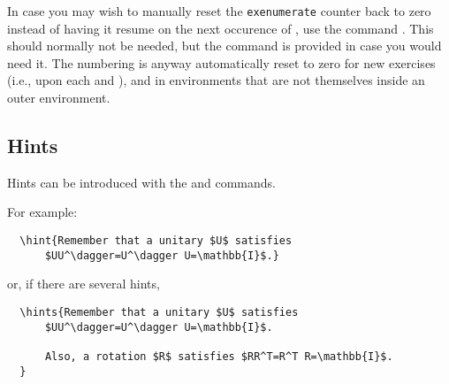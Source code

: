 \documentclass[11pt,a4paper]{article}
\begin{document}

In case you may wish to manually reset the \texttt{exenumerate} counter back to zero
instead of having it resume on the next occurence of , use the
command . This 
should normally not be needed, but the command is provided in case you would need it. The
numbering is anyway automatically reset to zero for new exercises (i.e., upon each
 and ), and in  environments that are not
themselves inside an outer  environment. 



\subsection{Hints}
\label{sec:Hints}

Hints can be introduced with the  and  commands.



For example:
\begin{pkgverbatim}
\begin{verbatim}
  \hint{Remember that a unitary $U$ satisfies
      $UU^\dagger=U^\dagger U=\mathbb{I}$.}
\end{verbatim}
\end{pkgverbatim}
or, if there are several hints,
\begin{pkgverbatim}
\begin{verbatim}
  \hints{Remember that a unitary $U$ satisfies
      $UU^\dagger=U^\dagger U=\mathbb{I}$.

      Also, a rotation $R$ satisfies $RR^T=R^T R=\mathbb{I}$.
  }
\end{verbatim}
\end{pkgverbatim}
\end{document}
